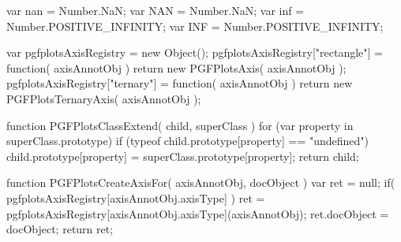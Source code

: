 var nan = Number.NaN;
var NAN = Number.NaN;
var inf = Number.POSITIVE_INFINITY;
var INF = Number.POSITIVE_INFINITY;

var pgfplotsAxisRegistry = new Object();
pgfplotsAxisRegistry["rectangle"]	= function( axisAnnotObj ) { return new PGFPlotsAxis( axisAnnotObj ); }
pgfplotsAxisRegistry["ternary"]		= function( axisAnnotObj ) { return new PGFPlotsTernaryAxis( axisAnnotObj ); }

function PGFPlotsClassExtend( child, superClass )
{
	for (var property in superClass.prototype) {
		if (typeof child.prototype[property] == "undefined")
			child.prototype[property] = superClass.prototype[property];
	}
	return child;
}

function PGFPlotsCreateAxisFor( axisAnnotObj, docObject )
{
	var ret = null;
	if( pgfplotsAxisRegistry[axisAnnotObj.axisType] ) {
		ret = pgfplotsAxisRegistry[axisAnnotObj.axisType](axisAnnotObj);
		ret.docObject = docObject;
	}
	return ret;
}

